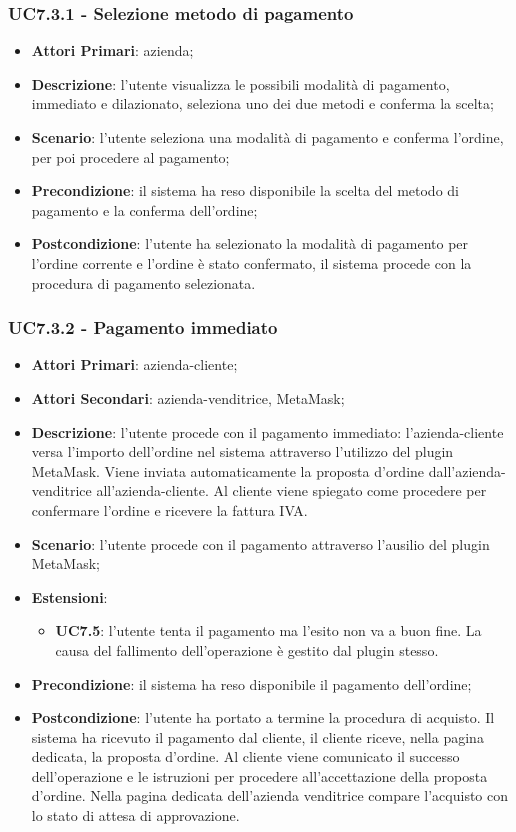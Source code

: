 \subsubsection{UC7.3.1 - Selezione metodo di pagamento}
\begin{itemize}
	\item \textbf{Attori Primari}: azienda;
	\item \textbf{Descrizione}: l'utente visualizza le possibili modalità di pagamento, immediato e dilazionato\glo, seleziona uno dei due metodi e conferma la scelta;
	\item \textbf{Scenario}: l'utente seleziona una modalità di pagamento e conferma l'ordine, per poi procedere al pagamento;
	\item \textbf{Precondizione}: il sistema ha reso disponibile la scelta del metodo di pagamento e la conferma dell'ordine;
	\item \textbf{Postcondizione}: l'utente ha selezionato la modalità di pagamento per l'ordine corrente e l'ordine è stato confermato, il sistema procede con la procedura di pagamento selezionata.
\end{itemize}

\subsubsection{UC7.3.2 - Pagamento immediato}
\begin{itemize}
	\item \textbf{Attori Primari}: azienda-cliente;
	\item \textbf{Attori Secondari}: azienda-venditrice, MetaMask\glo;
	\item \textbf{Descrizione}: l'utente procede con il pagamento immediato: l'azienda-cliente versa l'importo dell'ordine nel sistema attraverso l'utilizzo del plugin MetaMask\glo. Viene inviata automaticamente la proposta d'ordine dall'azienda-venditrice all'azienda-cliente. Al cliente viene spiegato come procedere per confermare l'ordine e ricevere la fattura IVA.
	\item \textbf{Scenario}: l'utente procede con il pagamento attraverso l'ausilio del plugin MetaMask\glo;
	\item \textbf{Estensioni}: 
	\begin{itemize}
		\item \textbf{UC7.5}: l'utente tenta il pagamento ma l'esito non va a buon fine. La causa del fallimento dell'operazione è gestito dal plugin stesso.
	\end{itemize}
	\item \textbf{Precondizione}: il sistema ha reso disponibile il pagamento dell'ordine;
	\item \textbf{Postcondizione}: l'utente ha portato a termine la procedura di acquisto. Il sistema ha ricevuto il pagamento dal cliente, il cliente riceve, nella pagina dedicata, la proposta d'ordine. Al cliente viene comunicato il successo dell'operazione e le istruzioni per procedere all'accettazione della proposta d'ordine. Nella pagina dedicata dell'azienda venditrice compare l'acquisto con lo stato di attesa di approvazione.
\end{itemize}

